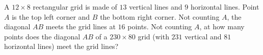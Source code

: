 A $12\times8$ rectangular grid is made of $13$ vertical lines and $9$ horizontal lines. Point $A$ is the top left corner and $B$ the bottom right corner. Not counting $A$, the diagonal $AB$ meets the grid lines at $16$ points. Not counting $A$, at how many points does the diagonal $AB$ of a $230\times80$ grid (with $231$ vertical and $81$ horizontal lines) meet the grid lines?
